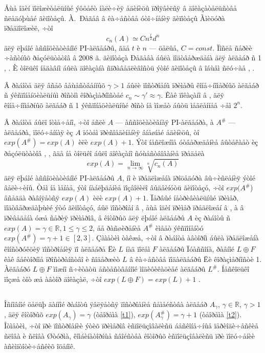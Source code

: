 \documentclass{article}
\numberwithin{equation}{section}
\theoremstyle{plain}
\theoremstyle{definition}
\begin{document}
\begin{fulltext}
Åùå îäèí ïîëîæèòåëüíûé ýôôåêò íàëè÷èÿ åäèíèöû ïðîÿâèëñÿ â äîêàçàòåëüñòâå ñëåäóþùåé
ãèïîòåçû.  À.~Ðåãåâ â êà÷åñòâå óòî÷íåíèÿ ãèïîòåçû Àìèöóðà ïðåäïîëîæèë, ÷òî
$$
c_n(A)\simeq C n^\frac{t}{2}d^n
$$
äëÿ ëþáîé àññîöèàòèâíîé PI-àëãåáðû, ãäå $t$ è $n$ --- öåëûå, $C=const$. Ïîñëå ñåðèè
÷àñòíûõ ðåçóëüòàòîâ â 2008 ã. ãèïîòåçà Ðåãåâà áûëà ïîäòâåðæäåíà äëÿ àëãåáð ñ 1
\cite{BR}, \cite{Be}. È òîëüêî íåäàâíî áûëà äîêàçàíà ñïðàâåäëèâîñòü
ýòîé ãèïîòåçû â îáùåì ñëó÷àå \cite{GZ1}, \cite{GZ2}.

Â ðàáîòå \cite{GMZ} äëÿ âñåõ âåùåñòâåííûõ $\gamma >1$ áûëè ïîñòðîåíû ïðèìåðû êîíå÷íîìåðíûõ
àëãåáð ñ ýêñïîíåíöèàëüíûì ðîñòîì êîðàçìåðíîñòåé $c_n\sim\gamma'\approx \gamma$. Êàê ïîêàçàíî
â \cite{Z1},  äëÿ êîíå÷íîìåðíûõ àëãåáð ñ 1 ýêñïîíåöèàëüíûé ðîñò íå ìîæåò áûòü ìåäëåííåå
÷åì $2^n$.

Â ðàáîòå \cite{GZ3} áûëî îòìå÷åíî, ÷òî åñëè $A$ --- àññîöèàòèâíàÿ PI-àëãåáðà, à
$A^\#$ --- àëãåáðà, ïîëó÷åííàÿ èç $A$ ïóòåì ïðèñîåäèíåíèÿ âíåøíåé åäèíèöû, òî
$exp(A^\#)=exp(A)$ èëè $exp(A)+1$. Ýòî íåñëîæíîå óòâåðæäåíèå âûòåêàåò èç
ðåçóëüòàòîâ \cite{GZ4}, \cite{GZ5}, ãäå íå òîëüêî áûëî äîêàçàíî ñóùåñòâîâàíèå 
ïðåäåëà
$$
exp(A)=\lim_{n\to \infty} \sqrt[n]{c_n(A)}
$$
äëÿ ëþáîé àññîöèàòèâíîé PI-àëãåáðû $A$, íî è ïðåäëîæåíà ïðîöåäóðà âû÷èñëåíèÿ ýòîé
âåëè÷èíû. Òåì íå ìåíåå, ýòî íàáëþäåíèå ïîçâîëèëî âûäâèíóòü ãèïîòåçó, ÷òî
$exp(A^\#$) âñåãäà ðàâíÿåòñÿ $exp(A)$ èëè $exp(A)+1$. Ïåðâûé íåòðèâèàëüíûé ïðèìåð,
ïîäòâåðæäàþùèé ýòó ãèïîòåçó, áûë ïîñòðîåí â \cite{Z1}, åùå îäèí ïðèìåð ïðåäëîæåí
â \cite{BBZ}, à â \cite{RZ} ïðèâåäåíà óæå ñåðèÿ ïðèìåðîâ, â êîòîðûõ äëÿ ëþáîé àëãåáðû
$A$ èç ðàáîòû \cite{GMZ} ñ $exp(A)=\gamma\in \mathbb R, 1\le\gamma\le 2$, åå
ðàñøèðåíèå $A^\#$ èìååò ýêñïîíåíòó $exp(A^\#)=\gamma +1\in [2,3]$. Çàìåòèì òàêæå,
÷òî â ðàáîòå \cite{Ra1} àâòîðîì áûëà ïðåäëîæåíà êîíñòðóêöèÿ ïîñòðîåíèÿ ïî àëãåáðå Ëè $L$
íàä ïîëåì $F$ àëãåáðû Ïóàññîíà, ðàâíîé $L\oplus F$ êàê âåêòîðíîå ïðîñòðàíñòâî è
ñîäåðæèò $L$ â êà÷åñòâå ïîäàëãåáðû Ëè êîðàçìåðíîñòè 1. Àëãåáðó $L\oplus F$
 ìîæíî ñ÷èòàòü åñòåñòâåííîé ìîäèôèêàöèåé àëãåáðû $L^\#$. Íåñêîëüêî ïîçæå òîò æå àâòîð
 äîêàçàë, ÷òî $exp(L\oplus F)=exp(L)+1$ \cite{Ra2}.
 
 
\subsection{}\label{s1.3}
Îñíîâíîé öåëüþ äàííîé ðàáîòû ÿâëÿåòñÿ ïîñòðîåíèå ñåìåéñòâà àëãåáð $A_\gamma$, 
$\gamma\in\mathbb R$, $\gamma >1$, äëÿ êîòîðûõ $exp(A_\gamma)=\gamma$ (òåîðåìà \ref{t1}),
$exp(A_\gamma^\#)=\gamma +1$ (òåîðåìà \ref{t2}). Îòìåòèì, ÷òî ïðè ïîñòðîåíèè 
ýòèõ ïðèìåðîâ èñïîëüçîâàëèñü áåñêîíå÷íûå ïåðèîäè÷åñêèå ñëîâà è ñëîâà Øòóðìà, 
êîìáèíàòîðíûå ñâîéñòâà êîòîðûõ èñïîëüçîâàëèñü ïðè ïîëó÷åíèè àñèìïòîòè÷åñêèõ
îöåíîê.


\end{fulltext}
\end{document}
